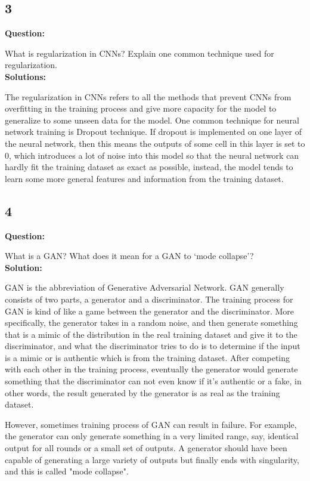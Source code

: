 \documentclass[a4paper]{article}
\begin{document}
\subsection*{3}
\textbf{Question:}

What is regularization in CNNs? Explain one common technique used for regularization.\\
\textbf{Solutions:}

The regularization in CNNs refers to all the methods that prevent CNNs from overfitting in the training process and give more capacity for the model to generalize to some unseen data for the model. One common technique for neural network training is Dropout technique. If dropout is implemented on one layer of the neural network, then this means the outputs of some cell in this layer is set to 0, which introduces a lot of noise into this model so that the neural network can hardly fit the training dataset as exact as possible, instead, the model tends to learn some more general features and information from the training dataset.

\subsection*{4}
\textbf{Question:}

What is a GAN? What does it mean for a GAN to ‘mode collapse’?\\
\textbf{Solution:}

GAN is the abbreviation of Generative Adversarial Network. GAN generally consists of two parts, a generator and a discriminator. The training process for GAN is kind of like a game between the generator and the discriminator. More specifically, the generator takes in a random noise, and then generate something that is a mimic of the distribution in the real training dataset and give it to the discriminator, and what the discriminator tries to do is to determine if the input is a mimic or is authentic which is from the training dataset. After competing with each other in the training process, eventually the generator would generate something that the discriminator can not even know if it's authentic or a fake, in other words, the result generated by the generator is as real as the training dataset.

However, sometimes training process of GAN can result in failure. For example, the generator can only generate something in a very limited range, say, identical output for all rounds or a small set of outputs. A generator should have been capable of generating a large variety of outputs but finally ends with singularity, and this is called "mode collapse".
\end{document}
